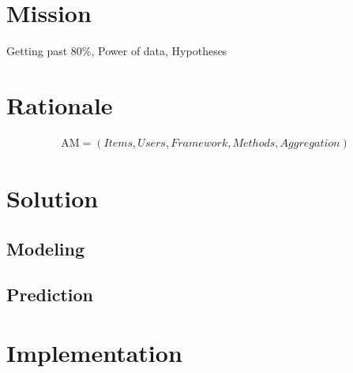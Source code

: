 \section{Mission}

Getting past 80\%,
Power of data,
Hypotheses

\section{Rationale}

\begin{eqnarray}
  \mathrm{AM} = (Items, Users, Framework, Methods, Aggregation)
\end{eqnarray}



\section{Solution}

\subsection{Modeling}
\subsection{Prediction}


\section{Implementation}      



